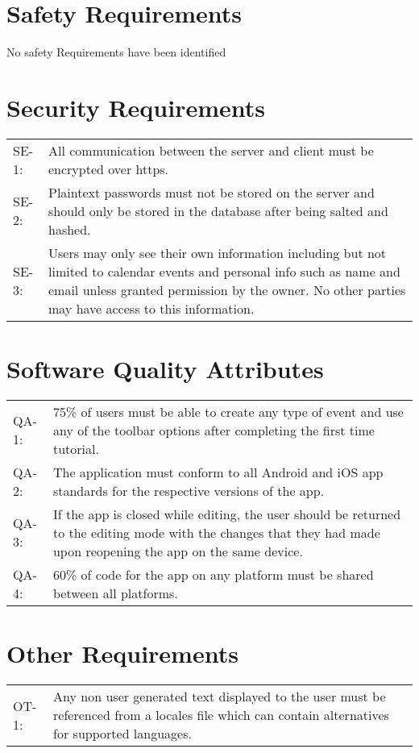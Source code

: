 \documentclass{scrreprt}
\begin{document}
\section{Safety Requirements}
No safety Requirements have been identified

\section{Security Requirements}
\begin{center}
\begin{tabular}{ p{1.5cm} p{13cm} }
SE-1: & All communication between the server and client must be encrypted over https.\\
SE-2: & Plaintext passwords must not be stored on the server and should only be
stored in the database after being salted and hashed.\\
SE-3: & Users may only see their own information including but not limited to calendar
events and personal info such as name and email unless granted permission by the owner.
No other parties may have access to this information.
\end{tabular}
\end{center}

\section{Software Quality Attributes}
\begin{center}
\begin{tabular}{ p{1.5cm} p{13cm} }
QA-1: & 75\% of users must be able to create any type of event and use any of the
toolbar options after completing the first time tutorial.\\
QA-2: & The application must conform to all Android and iOS app standards for the
respective versions of the app.\\
QA-3: & If the app is closed while editing, the user should be returned to the editing
mode with the changes that they had made upon reopening the app on the same device.\\
QA-4: & 60\% of code for the app on any platform must be shared between all platforms.
\end{tabular}
\end{center}

\section{Other Requirements}
\begin{center}
\begin{tabular}{ p{1.5cm} p{13cm} }
OT-1: & Any non user generated text displayed to the user must be referenced from
a locales file which can contain alternatives for supported languages.\\
\end{tabular}
\end{center}
\end{document}
